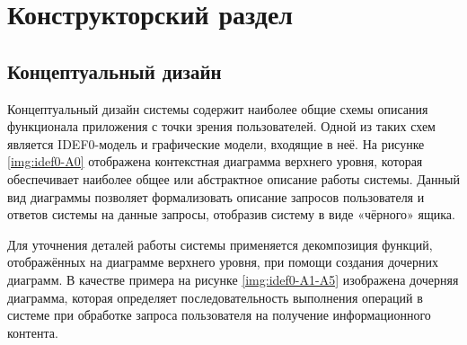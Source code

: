 \documentclass{bmstu-gost-7-32}
\begin{document}




\chapter*{Конструкторский раздел}

\section*{Концептуальный дизайн}

Концептуальный дизайн системы содержит наиболее общие схемы описания функционала приложения с точки зрения пользователей.
Одной из таких схем является IDEF0-модель и графические модели, входящие в неё.
На рисунке \ref{img:idef0-A0}  отображена контекстная диаграмма верхнего уровня, которая обеспечивает наиболее общее или абстрактное описание работы системы.
Данный вид диаграммы позволяет формализовать описание запросов пользователя и ответов системы на данные запросы, отобразив систему в виде «чёрного» ящика.


Для уточнения деталей работы системы применяется декомпозиция функций, отображённых на диаграмме верхнего уровня, при помощи создания дочерних диаграмм.
В качестве примера на рисунке \ref{img:idef0-A1-A5} изображена дочерняя диаграмма, которая определяет последовательность выполнения операций в системе при обработке запроса пользователя на получение информационного контента.
\end{document}
